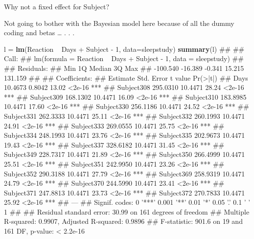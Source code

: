 \documentclass[11pt,ignorenonframetext,]{beamer}
\newenvironment{Shaded}{}{}
\newcommand{\KeywordTok}[1]{\textcolor[rgb]{0.00,0.44,0.13}{\textbf{#1}}}
\newcommand{\DataTypeTok}[1]{\textcolor[rgb]{0.56,0.13,0.00}{#1}}
\newcommand{\DecValTok}[1]{\textcolor[rgb]{0.25,0.63,0.44}{#1}}
\newcommand{\StringTok}[1]{\textcolor[rgb]{0.25,0.44,0.63}{#1}}
\newcommand{\OperatorTok}[1]{\textcolor[rgb]{0.40,0.40,0.40}{#1}}
\newcommand{\NormalTok}[1]{#1}
\let\oldShaded\Shaded
\let\endoldShaded\endShaded
\renewenvironment{Shaded}{\footnotesize\begin{spacing}{0.9}\oldShaded}{\endoldShaded\end{spacing}}
\begin{document}
\begin{frame}[fragile]{Why not a fixed effect for Subject?}

\small

Not going to bother with the Bayesian model here because of all the
dummy coding and betas \ldots{} . . .

\begin{Shaded}
\begin{Highlighting}[]
\NormalTok{l =}\StringTok{ }\KeywordTok{lm}\NormalTok{(Reaction }\OperatorTok{~}\StringTok{ }\NormalTok{Days }\OperatorTok{+}\StringTok{ }\NormalTok{Subject }\OperatorTok{-}\StringTok{ }\DecValTok{1}\NormalTok{, }\DataTypeTok{data=}\NormalTok{sleepstudy)}
\KeywordTok{summary}\NormalTok{(l)}
\NormalTok{## }
\NormalTok{## Call:}
\NormalTok{## lm(formula = Reaction ~ Days + Subject - 1, data = sleepstudy)}
\NormalTok{## }
\NormalTok{## Residuals:}
\NormalTok{##      Min       1Q   Median       3Q      Max }
\NormalTok{## -100.540  -16.389   -0.341   15.215  131.159 }
\NormalTok{## }
\NormalTok{## Coefficients:}
\NormalTok{##            Estimate Std. Error t value Pr(>|t|)    }
\NormalTok{## Days        10.4673     0.8042   13.02   <2e-16 ***}
\NormalTok{## Subject308 295.0310    10.4471   28.24   <2e-16 ***}
\NormalTok{## Subject309 168.1302    10.4471   16.09   <2e-16 ***}
\NormalTok{## Subject310 183.8985    10.4471   17.60   <2e-16 ***}
\NormalTok{## Subject330 256.1186    10.4471   24.52   <2e-16 ***}
\NormalTok{## Subject331 262.3333    10.4471   25.11   <2e-16 ***}
\NormalTok{## Subject332 260.1993    10.4471   24.91   <2e-16 ***}
\NormalTok{## Subject333 269.0555    10.4471   25.75   <2e-16 ***}
\NormalTok{## Subject334 248.1993    10.4471   23.76   <2e-16 ***}
\NormalTok{## Subject335 202.9673    10.4471   19.43   <2e-16 ***}
\NormalTok{## Subject337 328.6182    10.4471   31.45   <2e-16 ***}
\NormalTok{## Subject349 228.7317    10.4471   21.89   <2e-16 ***}
\NormalTok{## Subject350 266.4999    10.4471   25.51   <2e-16 ***}
\NormalTok{## Subject351 242.9950    10.4471   23.26   <2e-16 ***}
\NormalTok{## Subject352 290.3188    10.4471   27.79   <2e-16 ***}
\NormalTok{## Subject369 258.9319    10.4471   24.79   <2e-16 ***}
\NormalTok{## Subject370 244.5990    10.4471   23.41   <2e-16 ***}
\NormalTok{## Subject371 247.8813    10.4471   23.73   <2e-16 ***}
\NormalTok{## Subject372 270.7833    10.4471   25.92   <2e-16 ***}
\NormalTok{## ---}
\NormalTok{## Signif. codes:  0 '***' 0.001 '**' 0.01 '*' 0.05 '.' 0.1 ' ' 1}
\NormalTok{## }
\NormalTok{## Residual standard error: 30.99 on 161 degrees of freedom}
\NormalTok{## Multiple R-squared:  0.9907, Adjusted R-squared:  0.9896 }
\NormalTok{## F-statistic: 901.6 on 19 and 161 DF,  p-value: < 2.2e-16}
\end{Highlighting}
\end{Shaded}

\end{frame}
\end{document}
